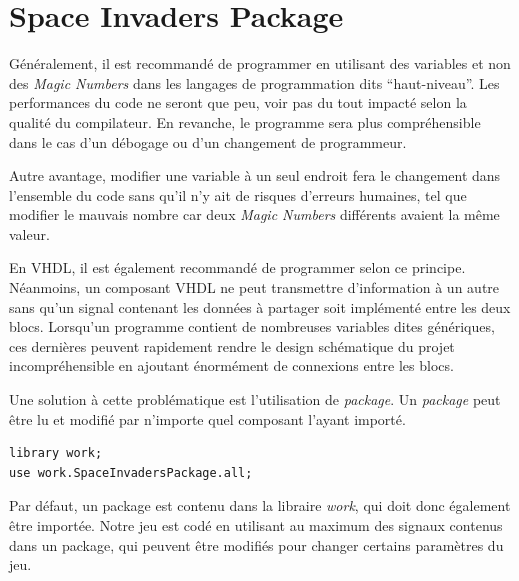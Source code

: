 \documentclass[french]{nakrule}
\begin{document}
\clearpage


\section{Space Invaders Package}
\label{sec:package}

Généralement, il est recommandé de programmer en utilisant des variables et non
des \emph{Magic Numbers} dans les langages de programmation dits
``haut-niveau''. Les performances du code ne seront que peu, voir pas du tout
impacté selon la qualité du compilateur. En revanche, le programme sera plus
compréhensible dans le cas d'un débogage ou d'un changement de programmeur.

Autre avantage, modifier une variable à un seul endroit fera le changement dans
l'ensemble du code sans qu'il n'y ait de risques d'erreurs humaines, tel que
modifier le mauvais nombre car deux \emph{Magic Numbers} différents avaient la
même valeur.

En VHDL, il est également recommandé de programmer selon ce principe. Néanmoins,
un composant VHDL ne peut transmettre d'information à un autre sans qu'un signal
contenant les données à partager soit implémenté entre les deux blocs. Lorsqu'un
programme contient de nombreuses variables dites génériques, ces dernières peuvent
rapidement rendre le design schématique du projet incompréhensible en ajoutant
énormément de connexions entre les blocs.

Une solution à cette problématique est l'utilisation de \emph{package}. Un
\emph{package} peut être lu et modifié par n'importe quel composant l'ayant
importé.
\begin{lstlisting}[style=vhdl, caption=Importation d'un package]
library work;
use work.SpaceInvadersPackage.all;
\end{lstlisting}

Par défaut, un package est contenu dans la libraire \emph{work}, qui doit donc
également être importée. Notre jeu est codé en utilisant au maximum des signaux
contenus dans un package, qui peuvent être modifiés pour changer certains
paramètres du jeu.
\end{document}
